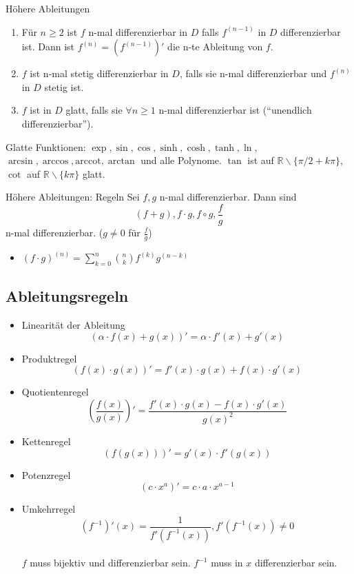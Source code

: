 \documentclass[a4paper,fontsize = 7pt]{scrartcl}
\def\R{\mathbb{R}}
\begin{document}
\begin{mainbox}{Höhere Ableitungen}
  \vspace{-8pt}
 \begin{enumerate}
  \item Für $n \ge 2$ ist $f$ n-mal differenzierbar in $D$ falls $f^{(n-1)}$ in $D$ differenzierbar ist. Dann ist $f^{(n)} = (f^{(n-1)})'$ die n-te Ableitung von $f$.
  \item $f$ ist n-mal stetig differenzierbar in $D$, falls sie n-mal differenzierbar und $f^{(n)}$ in $D$ stetig ist.
  \item $f$ ist in $D$ glatt, falls sie $\forall n \ge 1$ n-mal differenzierbar ist (``unendlich differenzierbar'').
 \end{enumerate}
 \vspace{-12pt}
\end{mainbox}
Glatte Funktionen: $\exp, \sin, \cos, \sinh, \cosh, \tanh, \ln,$\\ $ \arcsin, \arccos, \text{arccot}, \arctan$ und alle Polynome. $\tan$ ist auf $\R \backslash \{\pi/2 + k\pi\}$, $\cot$ auf $\R \backslash \{k\pi\}$ glatt.

\begin{subbox}{Höhere Ableitungen: Regeln}
  \vspace{-4pt}
  Sei $f, g$ n-mal differenzierbar. Dann sind $$(f + g), f \cdot g, f \circ g, \frac{f}{g}$$
  n-mal differenzierbar. ($g \neq 0$ für $\frac{f}{g}$)
  \begin{itemize}
  \item $(f \cdot g)^{(n)} = \sum_{k = 0}^{n} \binom{n}{k} f^{(k)} g^{(n-k)}$
  \end{itemize}
  \vspace{-10pt}
\end{subbox}

\subsection{Ableitungsregeln}

\begin{itemize}
  \item Linearität der Ableitung
  $$(\alpha \cdot f(x) + g(x))' = \alpha \cdot f'(x) + g'(x)$$
  \item Produktregel
  $$(f(x) \cdot g(x))' = f'(x) \cdot g(x) + f(x) \cdot g'(x)$$
  \item Quotientenregel
  $$\left(\frac{f(x)}{g(x)}\right)' = \frac{f'(x) \cdot g(x) - f(x) \cdot g'(x)}{g(x)^2}$$
  \item Kettenregel
  $$(f(g(x)))' = g'(x) \cdot f'(g(x))$$
  \item Potenzregel
  $$(c \cdot x^a)' = c \cdot a \cdot x^{a - 1}$$
  \item Umkehrregel
  $$(f^{-1})' (x) = \frac{1}{f'(f^{-1} (x))}, f'(f^{-1} (x)) \neq 0$$
  \\ $f$ muss bijektiv und differenzierbar sein. $f^{-1}$ muss in $x$ differenzierbar sein. 
\end{itemize}
\end{document}
